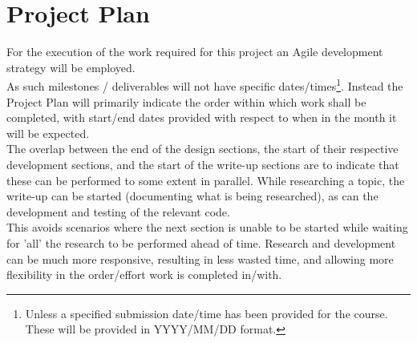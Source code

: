 \section{Project Plan}


For the execution of the work required for this project an Agile development strategy will be employed.\\
As such milestones / deliverables will not have specific dates/times\footnote{Unless a specified submission date/time has been provided for the course. These will be provided in YYYY/MM/DD format.}. Instead the Project Plan will primarily indicate the order within which work shall be completed, with start/end dates provided with respect to when in the month it will be expected\footnotemark[3].\\
The overlap between the end of the design sections, the start of their respective development sections, and the start of the write-up sections are to indicate that these can be performed to some extent in parallel. 
While researching a topic, the write-up can be started (documenting what is being researched), as can the development and testing of the relevant code.\\
This avoids scenarios where the next section is unable to be started while waiting for 'all' the research to be performed ahead of time.
Research and development can be much more responsive, resulting in less wasted time, and allowing more flexibility in the order/effort work is completed in/with.


